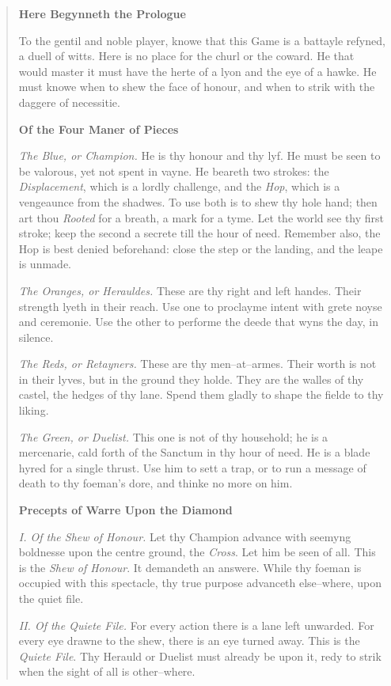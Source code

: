 \documentclass[11pt]{article}
\begin{document}
\begin{quote}\small
\textbf{Here Begynneth the Prologue}

To the gentil and noble player, knowe that this Game is a battayle refyned, a duell of witts. Here is no place for the churl or the coward. He that would master it must have the herte of a lyon and the eye of a hawke. He must knowe when to shew the face of honour, and when to strik with the daggere of necessitie.

\medskip
\textbf{Of the Four Maner of Pieces}

\textit{The Blue, or Champion.} He is thy honour and thy lyf. He must be seen to be valorous, yet not spent in vayne. He beareth two strokes: the \emph{Displacement}, which is a lordly challenge, and the \emph{Hop}, which is a vengeaunce from the shadwes. To use both is to shew thy hole hand; then art thou \emph{Rooted} for a breath, a mark for a tyme. Let the world see thy first stroke; keep the second a secrete till the hour of need. Remember also, the Hop is best denied beforehand: close the step or the landing, and the leape is unmade.

\textit{The Oranges, or Herauldes.} These are thy right and left handes. Their strength lyeth in their reach. Use one to proclayme intent with grete noyse and ceremonie. Use the other to performe the deede that wyns the day, in silence.

\textit{The Reds, or Retayners.} These are thy men--at--armes. Their worth is not in their lyves, but in the ground they holde. They are the walles of thy castel, the hedges of thy lane. Spend them gladly to shape the fielde to thy liking.

\textit{The Green, or Duelist.} This one is not of thy household; he is a mercenarie, cald forth of the Sanctum in thy hour of need. He is a blade hyred for a single thrust. Use him to sett a trap, or to run a message of death to thy foeman’s dore, and thinke no more on him.

\medskip
\textbf{Precepts of Warre Upon the Diamond}

\textit{I. Of the Shew of Honour.}
Let thy Champion advance with seemyng boldnesse upon the centre ground, the \emph{Cross}. Let him be seen of all. This is the \emph{Shew of Honour}. It demandeth an answere. While thy foeman is occupied with this spectacle, thy true purpose advanceth else--where, upon the quiet file.

\textit{II. Of the Quiete File.}
For every action there is a lane left unwarded. For every eye drawne to the shew, there is an eye turned away. This is the \emph{Quiete File}. Thy Herauld or Duelist must already be upon it, redy to strik when the sight of all is other--where.


\end{quote}
\end{document}
